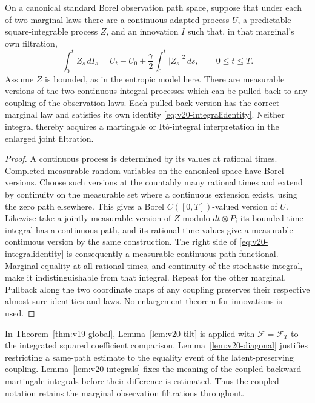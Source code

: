 \begin{lemma}
\label{lem:v20-integrals}
On a canonical standard Borel observation path space, suppose that under
each of two marginal laws there are a continuous adapted process $U$,
a predictable square-integrable process $Z$, and an innovation $I$ such
that, in that marginal's own filtration,
\begin{equation}\label{eq:v20-integralidentity}
 \int_0^t Z_s\,dI_s
   =U_t-U_0+\frac\gamma2\int_0^t|Z_s|^2\,ds,
 \qquad 0\le t\le T.
\end{equation}
Assume $Z$ is bounded, as in the entropic model here. There are measurable
versions of the two continuous integral processes which can be pulled
back to any coupling of the observation laws. Each pulled-back version
has the correct marginal law and satisfies its own identity
\eqref{eq:v20-integralidentity}. Neither integral thereby acquires a
martingale or It\^o-integral interpretation in the enlarged joint
filtration.
\end{lemma}
\begin{proof}
A continuous process is determined by its values at rational times.
Completed-measurable random variables on the canonical space have Borel
versions. Choose such versions at the countably many rational times and
extend by continuity on the measurable set where a continuous extension
exists, using the zero path elsewhere. This gives a Borel
$C([0,T])$-valued version of $U$. Likewise take a jointly measurable
version of $Z$ modulo $dt\otimes P$; its bounded time integral has a
continuous path, and its rational-time values give a measurable
continuous version by the same construction. The right side of
\eqref{eq:v20-integralidentity} is consequently a measurable continuous
path functional. Marginal equality at all rational times, and continuity
of the stochastic integral, make it indistinguishable from that integral.
Repeat for the other marginal. Pullback along the two coordinate maps of
any coupling preserves their respective almost-sure identities and laws.
No enlargement theorem for innovations is used.
\end{proof}

In Theorem~\ref{thm:v19-global}, Lemma~\ref{lem:v20-tilt} is applied with
$\mathcal F=\mathcal F_T$ to the integrated squared coefficient
comparison. Lemma~\ref{lem:v20-diagonal} justifies restricting a same-path
estimate to the equality event of the latent-preserving coupling.
Lemma~\ref{lem:v20-integrals} fixes the meaning of the coupled backward
martingale integrals before their difference is estimated. Thus the
coupled notation retains the marginal observation filtrations throughout.
